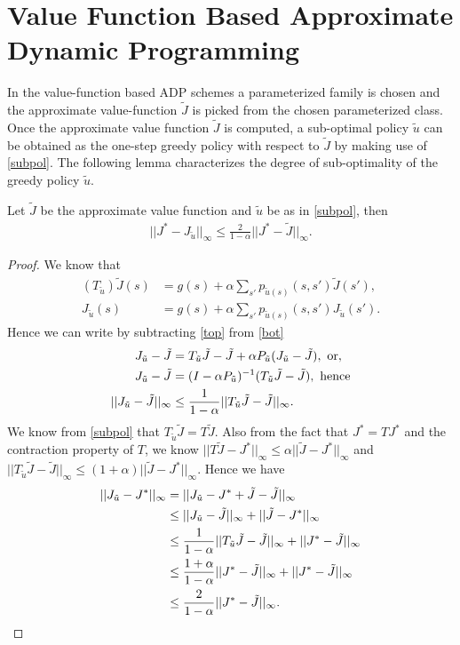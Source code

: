 \section{Value Function Based Approximate Dynamic Programming}
In the value-function based ADP schemes a parameterized family is chosen and the approximate value-function $\tilde{J}$ is picked from the chosen parameterized class.
Once the approximate value function $\tilde{J}$ is computed, a sub-optimal policy $\tilde{u}$ can be obtained as the one-step greedy policy with respect to $\tilde{J}$ by making use of \eqref{subpol}.
The following lemma characterizes the degree of sub-optimality of the greedy policy $\tilde{u}$.
\begin{lemma}\label{subopt}
Let $\tilde{J}$ be the approximate value function and $\tilde{u}$ be as in \eqref{subpol}, then 
\begin{align}
||J^*-J_{\tilde{u}}||_\infty \leq \frac{2}{1-\alpha}||J^*-\tilde{J}||_\infty.
\end{align}
\end{lemma}
\begin{proof}
We know that
\begin{align}
\label{top} (T_{\tilde{u}}) \tilde{J}(s) 	&= g(s)+\alpha \sum_{s'} p_{\tilde{u}(s)} (s,s') \tilde{J}(s'),\\
\label{bot} J_{\tilde{u}}(s)		&=g(s)+\alpha \sum_{s'} p_{\tilde{u}(s)}(s,s')J_{\tilde{u}}(s').
\end{align}
Hence we can write by subtracting \eqref{top} from \eqref{bot} 
\begin{align}
J_{\tilde{u}}-\tilde{J}&=T_{\tilde{u}}\tilde{J}-\tilde{J} +\alpha P_{\tilde{u}}(J_{\tilde{u}}-\tilde{J}),\mbox{ }\text{or},\nonumber\\
J_{\tilde{u}}-\tilde{J}&=(I-\alpha P_{\tilde{u}})^{-1}(T_{\tilde{u}}\tilde{J}-\tilde{J}),\mbox{ } \text{hence}\nonumber\\
||J_{\tilde{u}}-\tilde{J}||_\infty&\leq \frac{1}{1-\alpha}||T_{\tilde{u}}\tilde{J}-\tilde{J}||_\infty.\nonumber
\end{align}
We know from \eqref{subpol} that $T_{\tilde{u}}\tilde{J}=T\tilde{J}$. Also from the fact that $J^*=TJ^*$ and the contraction property of $T$, we know $||T\tilde{J}-J^*||_\infty\leq \alpha ||\tilde{J}-J^*||_\infty$ and $||T_{\tilde{u}}\tilde{J}-\tilde{J}||_\infty\leq (1+\alpha)||\tilde{J}-J^*||_\infty$. Hence we have
\begin{align}
||J_{\tilde{u}}-J^*||_\infty&=||J_{\tilde{u}}-J^*+\tilde{J}-\tilde{J}||_\infty\nonumber\\
&\leq  ||J_{\tilde{u}}-\tilde{J}||_\infty+||\tilde{J}-J^*||_\infty\nonumber\\
&\leq \frac{1}{1-\alpha}||T_{\tilde{u}}\tilde{J}-\tilde{J}||_\infty +||J^*-\tilde{J}||_\infty\nonumber\\
&\leq \frac{1+\alpha}{1-\alpha}||J^*-\tilde{J}||_\infty +||J^*-\tilde{J}||_\infty\nonumber\\
&\leq \frac{2}{1-\alpha}||J^*-\tilde{J}||_\infty\nonumber.
\end{align}
\end{proof}
